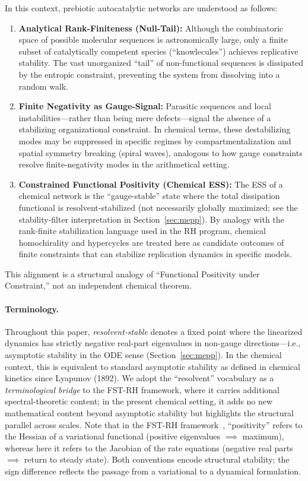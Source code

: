 \documentclass[12pt,a4paper]{article}
\theoremstyle{remark}
\begin{document}
In this context, prebiotic autocatalytic networks are understood as follows:
\begin{enumerate}[label=\alph*)]
    \item \textbf{Analytical Rank-Finiteness (Null-Tail):} Although the combinatoric space of possible molecular sequences is astronomically large, only a finite subset of catalytically competent species (``knowlecules'') achieves replicative stability. The vast unorganized ``tail'' of non-functional sequences is dissipated by the entropic constraint, preventing the system from dissolving into a random walk.
    \item \textbf{Finite Negativity as Gauge-Signal:} Parasitic sequences and local instabilities---rather than being mere defects---signal the absence of a stabilizing organizational constraint. In chemical terms, these destabilizing modes may be suppressed in specific regimes by compartmentalization and spatial symmetry breaking (spiral waves), analogous to how gauge constraints resolve finite-negativity modes in the arithmetical setting.
    \item \textbf{Constrained Functional Positivity (Chemical ESS):} The ESS of a chemical network is the ``gauge-stable'' state where the total dissipation functional is resolvent-stabilized (not necessarily globally maximized; see the stability-filter interpretation in Section~\ref{sec:mepp}). By analogy with the rank-finite stabilization language used in the RH program, chemical homochirality and hypercycles are treated here as candidate outcomes of finite constraints that can stabilize replication dynamics in specific models.
\end{enumerate}

This alignment is a structural analogy of ``Functional Positivity under Constraint,'' not an independent chemical theorem.

\paragraph{Terminology.} Throughout this paper, \emph{resolvent-stable} denotes a fixed point where the linearized dynamics has strictly negative real-part eigenvalues in non-gauge directions---i.e., asymptotic stability in the ODE sense (Section~\ref{sec:mepp}). In the chemical context, this is equivalent to standard asymptotic stability as defined in chemical kinetics since Lyapunov (1892). We adopt the ``resolvent'' vocabulary as a \emph{terminological bridge} to the FST-RH framework, where it carries additional spectral-theoretic content; in the present chemical setting, it adds no new mathematical content beyond asymptotic stability but highlights the structural parallel across scales. Note that in the FST-RH framework~\citep{GeigerRH2026b}, ``positivity'' refers to the Hessian of a variational functional (positive eigenvalues $\implies$ maximum), whereas here it refers to the Jacobian of the rate equations (negative real parts $\implies$ return to steady state). Both conventions encode structural stability; the sign difference reflects the passage from a variational to a dynamical formulation.
\end{document}
